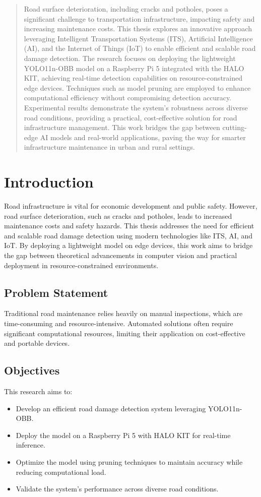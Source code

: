 \documentclass[12pt,a4paper]{report}
\begin{document}
\newpage
\begin{abstract}
Road surface deterioration, including cracks and potholes, poses a significant challenge to transportation infrastructure, impacting safety and increasing maintenance costs. This thesis explores an innovative approach leveraging Intelligent Transportation Systems (ITS), Artificial Intelligence (AI), and the Internet of Things (IoT) to enable efficient and scalable road damage detection. The research focuses on deploying the lightweight YOLO11n-OBB model on a Raspberry Pi 5 integrated with the HALO KIT, achieving real-time detection capabilities on resource-constrained edge devices. Techniques such as model pruning are employed to enhance computational efficiency without compromising detection accuracy. Experimental results demonstrate the system's robustness across diverse road conditions, providing a practical, cost-effective solution for road infrastructure management. This work bridges the gap between cutting-edge AI models and real-world applications, paving the way for smarter infrastructure maintenance in urban and rural settings.
\end{abstract}

\tableofcontents

\chapter{Introduction}
Road infrastructure is vital for economic development and public safety. However, road surface deterioration, such as cracks and potholes, leads to increased maintenance costs and safety hazards. This thesis addresses the need for efficient and scalable road damage detection using modern technologies like ITS, AI, and IoT. By deploying a lightweight model on edge devices, this work aims to bridge the gap between theoretical advancements in computer vision and practical deployment in resource-constrained environments.

\section{Problem Statement}
Traditional road maintenance relies heavily on manual inspections, which are time-consuming and resource-intensive. Automated solutions often require significant computational resources, limiting their application on cost-effective and portable devices.

\section{Objectives}
This research aims to:
\begin{itemize}
    \item Develop an efficient road damage detection system leveraging YOLO11n-OBB.
    \item Deploy the model on a Raspberry Pi 5 with HALO KIT for real-time inference.
    \item Optimize the model using pruning techniques to maintain accuracy while reducing computational load.
    \item Validate the system's performance across diverse road conditions.
\end{itemize}
\end{document}
